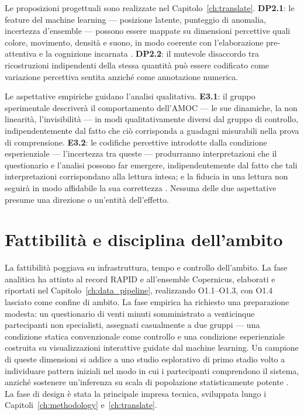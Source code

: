 Le proposizioni progettuali sono realizzate nel Capitolo~\ref{ch:translate}. \textbf{DP2.1}: le feature del machine learning --- posizione latente, punteggio di anomalia, incertezza d'ensemble --- possono essere mappate su dimensioni percettive quali colore, movimento, densità e suono, in modo coerente con l'elaborazione pre-attentiva e la cognizione incarnata \citep{lakoff1999, ware2021}. \textbf{DP2.2}: il mutevole disaccordo tra ricostruzioni indipendenti della stessa quantità può essere codificato come variazione percettiva sentita anziché come annotazione numerica.

Le aspettative empiriche guidano l'analisi qualitativa. \textbf{E3.1}: il gruppo sperimentale descriverà il comportamento dell'AMOC --- le sue dinamiche, la non linearità, l'invisibilità --- in modi qualitativamente diversi dal gruppo di controllo, indipendentemente dal fatto che ciò corrisponda a guadagni misurabili nella prova di comprensione. \textbf{E3.2}: le codifiche percettive introdotte dalla condizione esperienziale --- l'incertezza tra queste --- produrranno interpretazioni che il questionario e l'analisi possono far emergere, indipendentemente dal fatto che tali interpretazioni corrispondano alla lettura intesa; e la fiducia in una lettura non seguirà in modo affidabile la sua correttezza \citep{fischer2020}. Nessuna delle due aspettative presume una direzione o un'entità dell'effetto.



\section{Fattibilità e disciplina dell'ambito}
\label{sec:rq-feasibility}

La fattibilità poggiava su infrastruttura, tempo e controllo dell'ambito. La fase analitica ha attinto al record RAPID e all'ensemble Copernicus, elaborati e riportati nel Capitolo~\ref{ch:data_pipeline}, realizzando O1.1--O1.3, con O1.4 lasciato come confine di ambito. La fase empirica ha richiesto una preparazione modesta: un questionario di venti minuti somministrato a venticinque partecipanti non specialisti, assegnati casualmente a due gruppi --- una condizione statica convenzionale come controllo e una condizione esperienziale costruita su visualizzazioni interattive guidate dal machine learning. Un campione di queste dimensioni si addice a uno studio esplorativo di primo stadio volto a individuare pattern iniziali nel modo in cui i partecipanti comprendono il sistema, anziché sostenere un'inferenza su scala di popolazione statisticamente potente \citep{braunclarke2006, smithmcgannon2018, malterud2016}. La fase di design è stata la principale impresa tecnica, sviluppata lungo i Capitoli~\ref{ch:methodology} e~\ref{ch:translate}.

